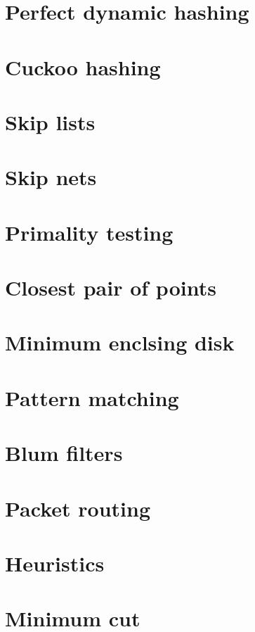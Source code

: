 \documentclass{book}
\begin{document}
\section{Perfect dynamic hashing}
\section{Cuckoo hashing}
\section{Skip lists}
\section{Skip nets}
\section{Primality testing}
\section{Closest pair of points}
\section{Minimum enclsing disk}
\section{Pattern matching}
\section{Blum filters}
\section{Packet routing} 
\section{Heuristics}
\section{Minimum cut}


\nocite{*}

\newpage


\end{document}
